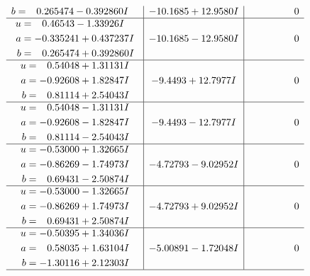 \documentclass[1p]{elsarticle_modified}
\theoremstyle{definition}
\begin{document}
$$\begin{array}{c|c|c}
\begin{aligned}
b &= \phantom{-}0.265474 - 0.392860 I\end{aligned}
 & -10.1685 + 12.9580 I & \phantom{-0.000000 } 0 \\ \hline\begin{aligned}
u &= \phantom{-}0.46543 - 1.33926 I \\
a &= -0.335241 + 0.437237 I \\
b &= \phantom{-}0.265474 + 0.392860 I\end{aligned}
 & -10.1685 - 12.9580 I & \phantom{-0.000000 } 0 \\ \hline\begin{aligned}
u &= \phantom{-}0.54048 + 1.31131 I \\
a &= -0.92608 + 1.82847 I \\
b &= \phantom{-}0.81114 + 2.54043 I\end{aligned}
 & -9.4493 + 12.7977 I & \phantom{-0.000000 } 0 \\ \hline\begin{aligned}
u &= \phantom{-}0.54048 - 1.31131 I \\
a &= -0.92608 - 1.82847 I \\
b &= \phantom{-}0.81114 - 2.54043 I\end{aligned}
 & -9.4493 - 12.7977 I & \phantom{-0.000000 } 0 \\ \hline\begin{aligned}
u &= -0.53000 + 1.32665 I \\
a &= -0.86269 - 1.74973 I \\
b &= \phantom{-}0.69431 - 2.50874 I\end{aligned}
 & -4.72793 - 9.02952 I & \phantom{-0.000000 } 0 \\ \hline\begin{aligned}
u &= -0.53000 - 1.32665 I \\
a &= -0.86269 + 1.74973 I \\
b &= \phantom{-}0.69431 + 2.50874 I\end{aligned}
 & -4.72793 + 9.02952 I & \phantom{-0.000000 } 0 \\ \hline\begin{aligned}
u &= -0.50395 + 1.34036 I \\
a &= \phantom{-}0.58035 + 1.63104 I \\
b &= -1.30116 + 2.12303 I\end{aligned}
 & -5.00891 - 1.72048 I & \phantom{-0.000000 } 0\\
 \hline 
 \end{array}$$\newpage$$\begin{array}{c|c|c}  

\end{array}$$
\end{document}
